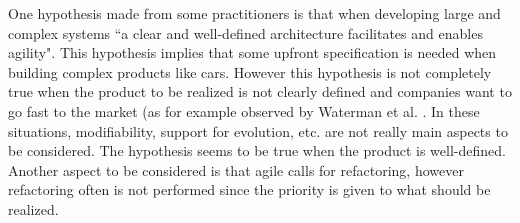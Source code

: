 %
One hypothesis made from some practitioners is that when developing large and complex systems ``a clear and well-defined architecture facilitates and enables
agility". This hypothesis implies that some upfront specification is needed when building complex products like cars.
However this hypothesis is not completely true when the product to be realized is not clearly defined and companies
want to go fast to the market (as for example observed by Waterman et al. \cite{WNA2015}. In these situations, modifiability, support for evolution, etc. are not really main aspects
to be considered. The hypothesis seems to be true when the product is well-defined. Another aspect to be considered
is that agile calls for refactoring, however refactoring often is not performed since the priority is given to what should
be realized.




